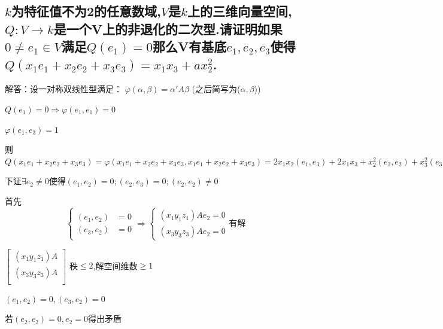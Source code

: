 \documentclass[UTF8]{book}
\begin{document}
		\subsection{$ k $为特征值不为2的任意数域,$ V $是$ k $上的三维向量空间,$ Q:V \to k $是一个V上的非退化的二次型.请证明如果$ 0 \ne e_{1} \in V $满足$ Q(e_{1} )=0 $那么V有基底$e_{1},e_{2},e_{3}$使得$ Q(x_{1} e_{1} + x_{2} e_{2} + x_{3} e_{3} )= x_{1} x_{3} +a x_{2}^{2}$.}
			解答：设一对称双线性型满足：
				$\varphi(\alpha,\beta)=\alpha 'A \beta$ (之后简写为($\alpha,\beta$))
				
				
				$ Q(e_{1} )=0 \Rightarrow \varphi (e_{1},e_{1} )=0 $
				
				
				$\varphi(e_{1},e_{3})=1$
				
				
				则$Q(x_{1} e_{1}+x_{2} e_{2}+x_{3} e_{3} )= \varphi (x_{1} e_{1}+x_{2} e_{2}+x_{3} e_{3},x_{1} e_{1}+x_{2} e_{2}+x_{3} e_{3} )
				=2 x_{1} x_{2}(e_{1},e_{3} )+2 x_{1} x_{3}+x_{2}^{2}(e_{2},e_{2} )+ x_{3}^{2}(e_{3},e_{3})+2 x_{2} x_{3}(e_{2},e_{3})$
				
				
				下证$\exists e_{2} \ne 0$使得$(e_{1},e_{2} )=0;(e_{2},e_{3} )=0;(e_{2},e_{2})\ne 0$
				
				
				首先
				\begin{equation*}
				\left\{\begin{aligned}\left(e_{1}, e_{2}\right) &=0 \\\left(e_{3}, e_{2}\right) &=0 \end{aligned} \Rightarrow\left\{\begin{array}{l}{\left(x_{1} y_{1} z_{1}\right) A e_{2}=0} \\ {\left(x_{3} y_{3} z_{3}\right) A e_{2}=0}\end{array}\right.\right. \text{有解}
				\end{equation*}
				
				$\begin{bmatrix}
				    (x_{1}y_{1}z_{1})A\\
				    (x_{3}y_{3}z_{3})A\\
				\end{bmatrix}$
				秩$\le 2$,解空间维数$\ge 1$
				
				
				$(e_{1},e_{2})=0,(e_{3},e_{2})=0$
				
				
				若$(e_{2},e_{2})=0,e_{2}=0$得出矛盾
				
\end{document}
